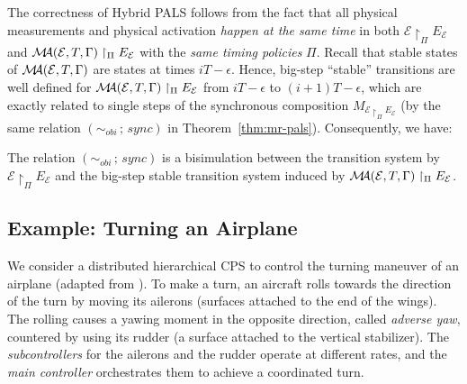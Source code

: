 The correctness of Hybrid PALS follows from the fact that 
all physical measurements and physical activation \emph{happen at the same time}
in both $\mathcal{E} \restriction_{\Pi} E_\mathcal{E}$  and $\mathcal{M}\!\!\mathcal{A}(\mathcal{E}, T, \Gamma) \restriction_{\Pi} E_\mathcal{E}$ with the \emph{same timing policies} $\Pi$.
%
Recall that stable states of $\mathcal{M}\!\!\mathcal{A}(\mathcal{E}, T, \Gamma)$ are states at times $iT - \epsilon$.
Hence,  big-step ``stable'' transitions are well defined for 
$\mathcal{M}\!\!\mathcal{A}(\mathcal{E}, T, \Gamma) \restriction_{\Pi} E_\mathcal{E}$
from $iT - \epsilon$ to $(i+1)T-\epsilon$,
which are exactly related to single steps of the synchronous composition 
$M_{\mathcal{E} \restriction_{\Pi} E_\mathcal{E}}$ (by the same relation $(\sim_\mathit{obi} \,;\, \mathit{sync})$ in Theorem~\ref{thm:mr-pals}).
Consequently, we have:


\begin{theorem}\label{thm:hybrid-pals} 
The relation $(\sim_\mathit{obi} \,;\, \mathit{sync})$ 
is a bisimulation between 
the transition system by $\mathcal{E} \restriction_{\Pi} E_\mathcal{E}$ 
and the big-step stable transition system induced by $\mathcal{M}\!\!\mathcal{A}(\mathcal{E}, T, \Gamma) \restriction_{\Pi} E_\mathcal{E}$.
\end{theorem}





\subsection{Example: Turning an Airplane}

We consider a distributed hierarchical CPS
to control the turning maneuver of an airplane (adapted from \cite{ftscs-journal}).
%
To make a turn, an aircraft rolls towards the direction of the turn
by moving its ailerons (surfaces attached to the end of the wings).
The rolling causes 
a yawing moment in the opposite direction, called \emph{adverse yaw},
countered by using its rudder (a surface attached to the vertical stabilizer).
%
The \emph{subcontrollers} for the ailerons and the rudder operate at different rates, 
and the \emph{main controller} orchestrates them to achieve a coordinated turn.



